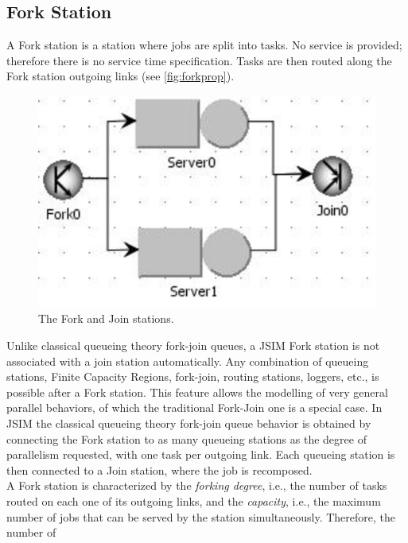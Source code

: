 \subsection{Fork Station}
\label{fstlab}
 A Fork station is a station where jobs
are split into tasks. No service is provided; therefore there is
no service time specification. Tasks are then routed along the
Fork station outgoing links (see \autoref{fig:forkprop}).\\
\begin{figure}[htb]
    \begin{center}
        \includegraphics[scale=.5]{img/jsimg/8.23.eps}
    \end{center}
    \caption{The Fork and Join stations.}
    \label{fig:forkprop}
\end{figure}
Unlike classical queueing theory fork-join queues, a JSIM Fork
station is not associated with a join station automatically. Any
combination of queueing stations, Finite Capacity Regions,
fork-join, routing stations, loggers, etc., is possible after a
Fork station. This feature allows the modelling of very general
parallel behaviors, of which the traditional Fork-Join one is a
special case. In JSIM the classical queueing theory fork-join
queue behavior is obtained by connecting the Fork station to as
many queueing stations as the degree of parallelism requested,
with one task per outgoing link. Each queueing station is then
connected to a Join station, where the job is recomposed.\\ A Fork
station is characterized by the \emph{forking degree}, i.e., the
number of tasks routed on each one of its outgoing links, and the
\emph{capacity}, i.e., the maximum number of jobs that can be
served by the station simultaneously. Therefore, the number of
